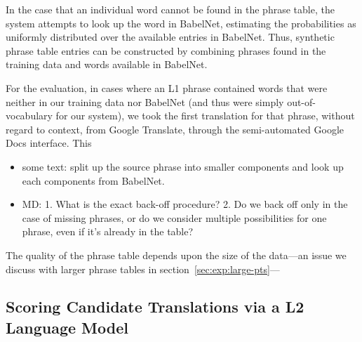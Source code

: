 \documentclass[11pt]{article}
\begin{document}
In the case that an individual word cannot be found in the phrase table, the
system attempts to look up the word in BabelNet, estimating the probabilities
as uniformly distributed over the available entries in BabelNet. Thus,
synthetic phrase table entries can be constructed by combining phrases found in
the training data and words available in BabelNet.

For the evaluation, in cases where an L1 phrase contained words that were
neither in our training data nor BabelNet (and thus were simply
out-of-vocabulary for our system), we took the first translation for that
phrase, without regard to context, from Google Translate, through the
semi-automated Google Docs interface. This 

\begin{itemize}
\item some text: split up the source phrase into smaller components
  and look up each components from BabelNet.
\item MD: 1. What is the exact back-off procedure? 2. Do we back off
  only in the case of missing phrases, or do we consider multiple
  possibilities for one phrase, even if it’s already in the table?
\end{itemize}

The quality of the phrase table depends upon the size of the data---an issue we
discuss with larger phrase tables in section~\ref{sec:exp:large-pts}---




\subsection{Scoring Candidate Translations via a L2 Language Model}
\label{sec:l2model}
\end{document}
